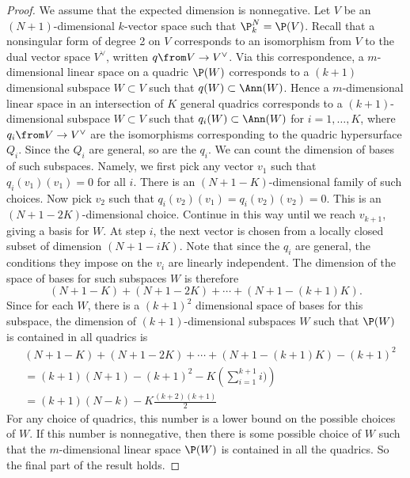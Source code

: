 \begin{proof}
We assume that the expected dimension is nonnegative. Let $V$ be an $(N+1)$-dimensional $k$-vector space such that $\P_k^N = \P(V)$. Recall that a nonsingular form of degree 2 on $V$ corresponds to an isomorphism from $V$ to the dual vector space $V^\vee$, written $q \from V \to V^\vee$. Via this correspondence, a $m$-dimensional linear space on a quadric $\P(W)$ corresponds to a $(k+1)$ dimensional subspace $W \subset V$ such that $q(W) \subset \Ann(W)$. Hence a $m$-dimensional linear space in an intersection of $K$ general quadrics corresponds to a $(k+1)$-dimensional subspace $W \subset V$ such that $q_i(W) \subset \Ann(W)$ for $i=1,\dots,K$, where $q_i\from V \to V^\vee$ are the isomorphisms corresponding to the quadric hypersurface $Q_i$. Since the $Q_i$ are general, so are the $q_i$. We can count the dimension of bases of such subspaces. Namely, we first pick any vector $v_1$ such that $q_i(v_1)(v_1) = 0$ for all $i$. There is an $(N+1-K)$-dimensional family of such choices. Now pick $v_2$ such that $q_i(v_2)(v_1) = q_i(v_2)(v_2) = 0$. This is an $(N+1-2K)$-dimensional choice. Continue in this way until we reach $v_{k+1}$, giving a basis for $W$. At step $i$, the next vector is chosen from a locally closed subset of dimension $(N+1-iK)$. Note that since the $q_i$ are general, the conditions they impose on the $v_i$ are linearly independent. The dimension of the space of bases for such subspaces $W$ is therefore
\[(N+1-K)+(N+1-2K)+\cdots+(N+1-(k+1)K).\]
Since for each $W$, there is a $(k+1)^2$ dimensional space of bases for this subspace, the dimension of $(k+1)$-dimensional subspaces $W$ such that $\P(W)$ is contained in all quadrics is
\begin{align*}
  &(N+1-K)+(N+1-2K)+\cdots+(N+1-(k+1)K) - (k+1)^2\\
 &= (k+1)(N+1) - (k+1)^2 - K \left(\sum_{i=1}^{k+1}i )\right)\\
&= (k+1)(N-k) - K \frac{(k+2)(k+1)}{2}
\end{align*}
For any choice of quadrics, this number is a lower bound on the possible choices of $W$. If this number is nonnegative, then there is some possible choice of $W$ such that the $m$-dimensional linear space $\P(W)$ is contained in all the quadrics. So the final part of the result holds.

\end{proof}
